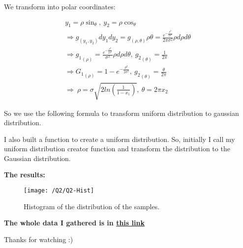 \documentclass{article}
\begin{document}
    We transform into polar coordinates:

    \begin{gather*}
        y_1 = \rho \sin_{\theta}, \ y_2 = \rho \cos_{\theta}\\
        \Rightarrow g_{(y_1,y_2)}dy_1 dy_2 = g_{(\rho,\theta)}\rho \theta = \frac{e^{-\frac{\rho^2}{2\sigma^2}}}{2\pi\sigma^2}\rho d{\rho}d{\theta}\\
        \Rightarrow {g_1}_{(\rho)} = \frac{e^{-\frac{\rho^2}{2\sigma^2}}}{\sigma^2}\rho d{\rho}d{\theta},\ {g_2}_{(\theta)} = \frac{1}{2\pi} \\
        \Rightarrow {G_1}_{(\rho)} = 1 - e^{-\frac{\rho^2}{2\sigma^2}} ,\ {g_2}_{(\theta)} = \frac{\theta}{2\pi}\\
        \Rightarrow \ \rho = \sigma \sqrt{2ln(\frac{1}{1-x_1})},\ \theta = 2\pi x_2
    \end{gather*}

    So we use the following formula to transform uniform distribution to gaussian distribution.

    \pagebreak

    I also built a function to create a uniform distribution. So, initially I call my uniform distribution creator function and transform the distribution to the Gaussian distribution.

    \textbf{The results:}

    \begin{figure}[!htb]
        \centering
        \texttt{[image: /Q2/Q2-Hist]}
        \label{fig:2.1}
        \caption{Histogram of the distribution of the samples.}
    \end{figure}

    \centering
    \textbf{The whole data I gathered is in \href{https://github.com/shahmari/ComputationalPhysics-Fall2021/tree/main/ProblemSet6/Data}{this link}}

    Thanks for watching :)
\end{document}
